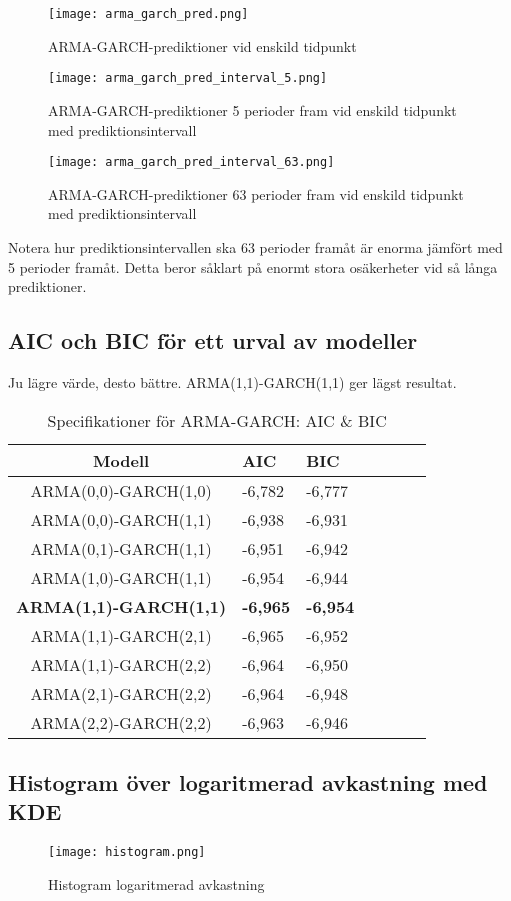 \documentclass[11pt]{article}
\numberwithin{equation}{section}
\numberwithin{table}{section}
\numberwithin{figure}{section}
\begin{document}
\begin{figure}[H]
\caption{ARMA-GARCH-prediktioner vid enskild tidpunkt}
\texttt{[image: arma\_garch\_pred.png]}
\centering
\end{figure}

\begin{figure}[H]
\caption{ARMA-GARCH-prediktioner 5 perioder fram vid enskild tidpunkt med prediktionsintervall}
\texttt{[image: arma\_garch\_pred\_interval\_5.png]}
\centering
\end{figure}

\begin{figure}[H]
\caption{ARMA-GARCH-prediktioner 63 perioder fram vid enskild tidpunkt med prediktionsintervall}
\texttt{[image: arma\_garch\_pred\_interval\_63.png]}
\centering
\end{figure}
Notera hur prediktionsintervallen ska 63 perioder framåt är enorma jämfört med 5 perioder framåt. Detta beror såklart på enormt stora osäkerheter vid så långa prediktioner.

\subsection{AIC och BIC för ett urval av modeller}
Ju lägre värde, desto bättre. ARMA(1,1)-GARCH(1,1) ger lägst resultat.

\begin{table}[H]
\caption{Specifikationer för ARMA-GARCH: AIC \& BIC}
\begin{tabularx}{\textwidth}{c *{6}{Y}}
\toprule
Modell  & AIC & BIC  \\
\hline

ARMA(0,0)-GARCH(1,0)            & -6,782                &   -6,777     \\

ARMA(0,0)-GARCH(1,1)            & -6,938         & -6,931    \\


ARMA(0,1)-GARCH(1,1)            & -6,951         & -6,942   \\

ARMA(1,0)-GARCH(1,1)           & -6,954         & -6,944   \\


\textbf{ARMA(1,1)-GARCH(1,1)}           & \textbf{-6,965}          & \textbf{-6,954}
    \\ 

ARMA(1,1)-GARCH(2,1)           & -6,965         & -6,952   \\ 

ARMA(1,1)-GARCH(2,2)           & -6,964        & -6,950
   \\ 

ARMA(2,1)-GARCH(2,2)           &-6,964        & -6,948    \\ 

ARMA(2,2)-GARCH(2,2)           & -6,963         &  -6,946
   \\ 

\bottomrule
\end{tabularx}
\end{table}

\subsection{Histogram över logaritmerad avkastning med KDE}
\begin{figure}[H]
\caption{Histogram logaritmerad avkastning}
\texttt{[image: histogram.png]}
\centering
\end{figure}
\end{document}
